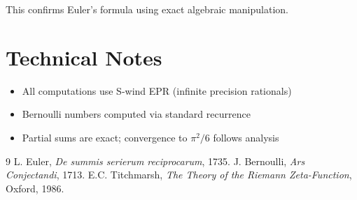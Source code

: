 \documentclass[11pt,a4paper]{article}
\begin{document}
This confirms Euler's formula using exact algebraic manipulation.

\section{Technical Notes}

\begin{itemize}
    \item All computations use S-wind EPR (infinite precision rationals)
    \item Bernoulli numbers computed via standard recurrence
    \item Partial sums are exact; convergence to $\pi^2/6$ follows analysis
\end{itemize}

\begin{thebibliography}{9}
 L. Euler, \textit{De summis serierum reciprocarum}, 1735.
 J. Bernoulli, \textit{Ars Conjectandi}, 1713.
 E.C. Titchmarsh, \textit{The Theory of the Riemann Zeta-Function}, Oxford, 1986.
\end{thebibliography}
\end{document}
